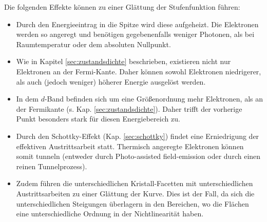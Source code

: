 \documentclass[bachelor,       %
               twoside,        %
               BCOR10mm,       %
               english,ngerman, %
               ]{GAUBM}
\begin{document}
Die folgenden Effekte können zu einer Glättung der Stufenfunktion führen:
\begin{itemize}
	\item Durch den Energieeintrag in die Spitze wird diese aufgeheizt. Die Elektronen werden so angeregt und benötigen gegebenenfalls weniger Photonen, als bei Raumtemperatur oder dem absoluten Nullpunkt.
	\item Wie in Kapitel \ref{sec:zustandsdichte} beschrieben, existieren nicht nur Elektronen an der Fermi-Kante. Daher können sowohl Elektronen niedrigerer, als auch (jedoch weniger) höherer Energie ausgelöst werden.
	\item In dem $d$-Band befinden sich um eine Größenordnung mehr Elektronen, als an der Fermikante (s. Kap. \ref{sec:zustandsdichte}). Daher trifft der vorherige Punkt besonders stark für diesen Energiebereich zu.
	\item Durch den Schottky-Effekt (Kap. \ref{sec:schottky}) findet eine Erniedrigung der effektiven Austrittsarbeit statt. Thermisch angeregte Elektronen können somit tunneln (entweder durch Photo-assisted field-emission oder durch einen reinen Tunnelprozess).
	\item Zudem führen die unterschiedlichen Kristall-Facetten mit unterschiedlichen Austrittsarbeiten zu einer Glättung der Kurve. Dies ist der Fall, da sich die unterschiedlichen Steigungen überlagern in den Bereichen, wo die Flächen eine unterschiedliche Ordnung in der Nichtlinearität haben.
\end{itemize}









\appendix
\end{document}
